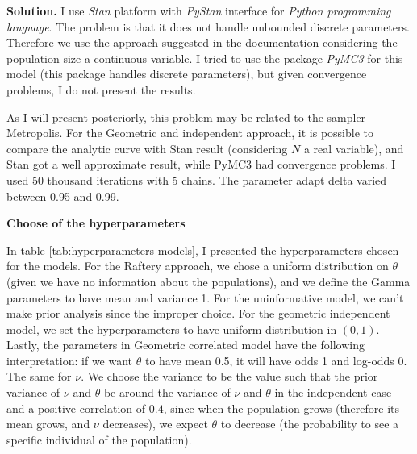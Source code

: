 \vspace{2ex}

    {\bf Solution.} I use {\em Stan} platform with {\em PyStan} interface for
    {\em Python programming language}. The problem is that it does not handle
    unbounded discrete parameters. Therefore we use the approach suggested in
    the documentation \cite{stan} considering the population size a continuous
    variable. I tried to use the package {\em PyMC3} for this model (this
    package handles discrete parameters), but given convergence problems,
    I do not present the results. 
    
    \ind As I will present posteriorly, this problem
    may be related to the sampler Metropolis. For the Geometric and
    independent approach, it is possible to compare the analytic curve with
    Stan result (considering $N$ a real variable), and Stan got a well
    approximate result, while PyMC3 had convergence problems. I used 50
    thousand iterations with 5 chains. The parameter adapt delta varied
    between 0.95 and 0.99. 

    \vspace{2ex}

    {\bf Choose of the hyperparameters}

    \vspace{2ex}

    \ind In table \ref{tab:hyperparameters-models}, I presented the hyperparameters
    chosen for the models. For the Raftery approach, we chose a
    uniform distribution on $\theta$ (given we have no information about the
    populations), and we define the Gamma parameters to have mean and variance
    1. For the uninformative model, we can't make prior analysis since the
    improper choice. For the geometric independent model, we set the
    hyperparameters to have uniform distribution in $(0,1)$. Lastly, the
    parameters in Geometric correlated model have the following
    interpretation: if we want $\theta$ to have mean 0.5, it will have odds 1
    and log-odds 0. The same for $\nu$. We choose the variance to be the value
    such that the prior variance
    of $\nu$ and $\theta$ be around the variance of $\nu$ and $\theta$ in the independent case and a positive correlation of $0.4$, since when the population grows
    (therefore its mean grows, and $\nu$ decreases), we expect $\theta$ to
    decrease (the probability to see a specific individual of the population). 

    \vspace{2ex}

